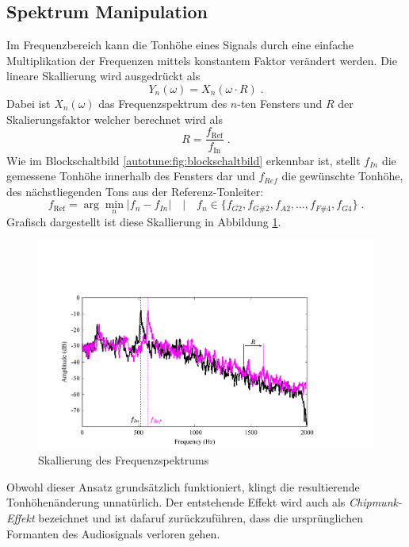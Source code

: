 \subsection{Spektrum Manipulation
\label{autotune:subsection:spektrumManipulation}}
Im Frequenzbereich kann die Tonhöhe eines Signals durch eine einfache Multiplikation der Frequenzen mittels konstantem Faktor verändert werden.
Die lineare Skallierung wird ausgedrückt als
\begin{equation}
    Y_n(\omega)
    =
    X_n(\omega \cdot R) \;.
\end{equation}
Dabei ist $X_n(\omega)$ das Frequenzspektrum des $n$-ten Fensters und $R$ der Skalierungsfaktor welcher berechnet wird als
\begin{equation}
    R
    =
    \frac{f_{\text{Ref}}}{{f_{\text{In}}}} \;.
\end{equation}
Wie im Blockschaltbild \ref{autotune:fig:blockschaltbild} erkennbar ist,
stellt $f_{In}$ die gemessene Tonhöhe innerhalb des Fensters dar und $f_{Ref}$ die gewünschte Tonhöhe,
des nächstliegenden Tons aus der Referenz-Tonleiter:
\begin{equation}
    f_{\text{Ref}}
    =
    \arg\min_n \left| f_n - f_{In} \right|
    \quad | \quad
    f_n \in \{ f_{G2}, f_{G\#2}, f_{A2}, \ldots, f_{F\#4}, f_{G4} \} \; .
\end{equation}
Grafisch dargestellt ist diese Skallierung in Abbildung \ref{autotune:fig:spektrumManipulation}.
\begin{figure}
    \centering
    \includegraphics[width=\textwidth]{papers/autotune/images/Spektrum-Manipulation.pdf}
    \caption{Skallierung des Frequenzspektrums}
    \label{autotune:fig:spektrumManipulation}
\end{figure}
Obwohl dieser Ansatz grundsätzlich funktioniert, klingt die resultierende Tonhöhenänderung unnatürlich.
Der entstehende Effekt wird auch als \textit{Chipmunk-Effekt} bezeichnet und ist dafaruf zurückzuführen,
dass die ursprünglichen Formanten des Audiosignals verloren gehen.

